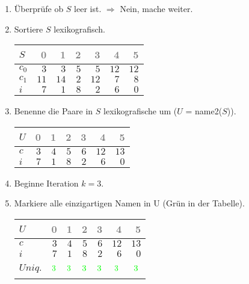 \begin{enumerate}
\item 
Überprüfe ob $S$ leer ist.
$\Rightarrow$ Nein, mache weiter.

\item 
Sortiere $S$ lexikografisch.
\begin{center}
\small\begin{tabular}{lrrrrrr}
    \toprule 
    $S$ & \textcolor{gray}{0} & \textcolor{gray}{1} & \textcolor{gray}{2} & \textcolor{gray}{3} & \textcolor{gray}{4} & \textcolor{gray}{5}\\
    \midrule 
    $c_0$ & $3$ & $3$ & $5$ & $5$ & $12$ & $12$ \\
    $c_1$ & $11$ & $14$ & $2$ & $12$ & $7$ & $8$ \\
    $i$ & $7$ & $1$ & $8$ & $2$ & $6$ & $0$ \\
    \bottomrule 
\end{tabular}
\end{center}

\item 
Benenne die Paare in $S$ lexikografische um ($U$ = name2($S$)).
\begin{center}
\small\begin{tabular}{lrrrrrr}
    \toprule 
    $U$ & \textcolor{gray}{0} & \textcolor{gray}{1} & \textcolor{gray}{2} & \textcolor{gray}{3} & \textcolor{gray}{4} & \textcolor{gray}{5}\\
    \midrule 
    $c$ & $3$ & $4$ & $5$ & $6$ & $12$ & $13$ \\
    $i$ & $7$ & $1$ & $8$ & $2$ & $6$ & $0$ \\
    \bottomrule 
\end{tabular}
\end{center}
\item 
Beginne Iteration $k = 3$.

\item 
Markiere alle einzigartigen Namen in U (Grün in der Tabelle).
\begin{center}
\small\begin{tabular}{lrrrrrr}
    \toprule 
    $U$ & \textcolor{gray}{0} & \textcolor{gray}{1} & \textcolor{gray}{2} & \textcolor{gray}{3} & \textcolor{gray}{4} & \textcolor{gray}{5}\\
    \midrule 
    $c$ & $3$ & $4$ & $5$ & $6$ & $12$ & $13$ \\
    $i$ & $7$ & $1$ & $8$ & $2$ & $6$ & $0$ \\
    $Uniq.$ & $$\cmarkc$$ & $$\cmarkc$$ & $$\cmarkc$$ & $$\cmarkc$$ & $$\cmarkc$$ & $$\cmarkc$$ \\
    \bottomrule 
\end{tabular}
\end{center}


\end{enumerate}
